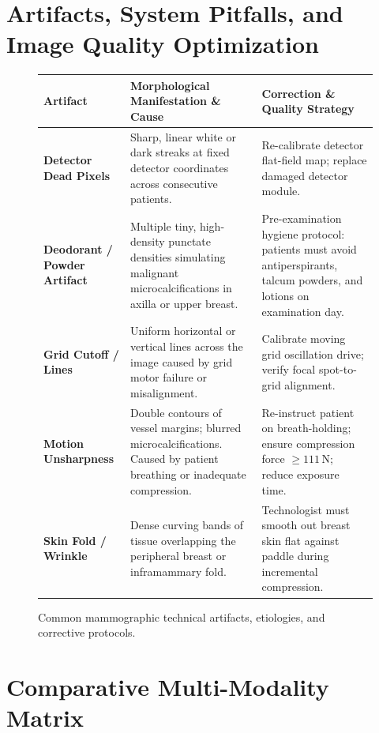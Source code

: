 \documentclass[11pt,a4paper]{article}
\begin{document}
\section{Artifacts, System Pitfalls, and Image Quality Optimization}

\begin{figure}[htbp]
\centering
\setlength{\tabcolsep}{4pt}
\begin{tabular}{p{3.2cm}p{5.5cm}p{5.5cm}}
\toprule
\textbf{Artifact} & \textbf{Morphological Manifestation \& Cause} & \textbf{Correction \& Quality Strategy} \\
\midrule
\textbf{Detector Dead Pixels} & Sharp, linear white or dark streaks at fixed detector coordinates across consecutive patients. & Re-calibrate detector flat-field map; replace damaged detector module. \\
\addlinespace
\textbf{Deodorant / Powder Artifact} & Multiple tiny, high-density punctate densities simulating malignant microcalcifications in axilla or upper breast. & Pre-examination hygiene protocol: patients must avoid antiperspirants, talcum powders, and lotions on examination day. \\
\addlinespace
\textbf{Grid Cutoff / Lines} & Uniform horizontal or vertical lines across the image caused by grid motor failure or misalignment. & Calibrate moving grid oscillation drive; verify focal spot-to-grid alignment. \\
\addlinespace
\textbf{Motion Unsharpness} & Double contours of vessel margins; blurred microcalcifications. Caused by patient breathing or inadequate compression. & Re-instruct patient on breath-holding; ensure compression force $\ge 111\,\text{N}$; reduce exposure time. \\
\addlinespace
\textbf{Skin Fold / Wrinkle} & Dense curving bands of tissue overlapping the peripheral breast or inframammary fold. & Technologist must smooth out breast skin flat against paddle during incremental compression. \\
\bottomrule
\end{tabular}
\caption{Common mammographic technical artifacts, etiologies, and corrective protocols.}
\label{tab:artifacts}
\end{figure}

\section{Comparative Multi-Modality Matrix}
\end{document}
